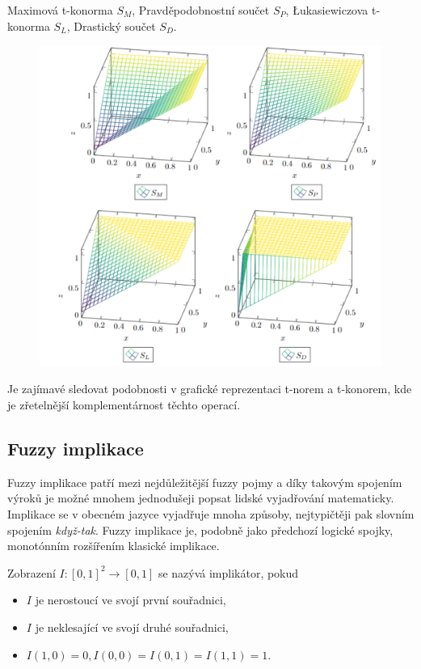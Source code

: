 \begin{graph} Maximová t-konorma $S_M$, Pravděpodobnostní součet $S_P$, Łukasiewiczova t-konorma $S_L$, Drastický součet $S_D$.\\

   \begin{figure}[H]
                \hspace{-1cm}
                \includegraphics[scale=0.5]{template-fig/konormy.pdf}
                \centering
            \end{figure}

\end{graph}

Je zajímavé sledovat podobnosti v grafické reprezentaci t-norem a t-konorem, kde je zřetelnější komplementárnost těchto operací.

\subsection{Fuzzy implikace} 


Fuzzy implikace patří mezi nejd\r uležitější fuzzy pojmy a díky takovým spojením výrok\r u je možné mnohem jednodušeji popsat lidské vyjadřování matematicky. Implikace se v obecném jazyce vyjadřuje mnoha zp\r usoby, nejtypičtěji pak slovním spojením \textit{když-tak}. Fuzzy implikace je, podobn\v e jako p\v redchoz\'i logick\'e spojky, monot\'onn\'im roz\v s\'i\v ren\'im klasick\'e implikace.
\begin{definition} \label{impl}
    Zobrazení $I: [0,1]^2 \rightarrow [0,1] $ se nazývá implikátor, pokud
    \begin{itemize}
        \item $I$ je nerostoucí ve svojí první souřadnici,
        \item $I$ je neklesající ve svojí druhé souřadnici,
        \item $I(1,0) = 0, I(0,0) =  I(0,1) = I(1,1) = 1.$
    \end{itemize}
\end{definition}


